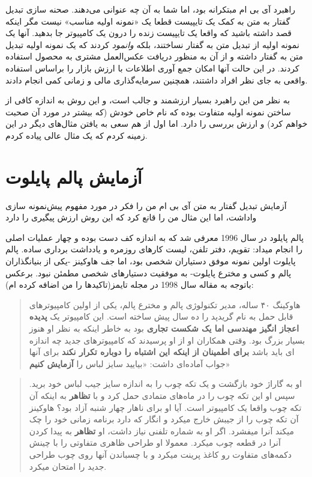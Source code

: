راهبرد آی بی ام مبتکرانه بود، اما شما به آن چه عنوانی می‌دهند. صحنه سازی
تبدیل گفتار به متن به کمک یک تایپیست قطعا یک «نمونه اولیه مناسب» نیست
مگر اینکه قصد داشته باشید که واقعا یک تایپیست زنده را درون یک کامپیوتر
جا بدهید. آنها یک نمونه اولیه از تبدیل متن به گفتار نساختند، بلکه
\emph{وانمود} کردند که یک نمونه اولیه تبدیل متن به گفتار داشته و از آن
به منظور دریافت عکس‌العمل مشتری به محصول استفاده کردند. در این حالت آنها
امکان جمع آوری اطلاعات با ارزش بازار را براساس استفاده واقعی به جای نظر
افراد داشتند، همچنین سرمایه‌گذاری مالی و زمانی کمی انجام دادند.

به نظر من این راهبرد بسیار ارزشمند و جالب است، و این روش به اندازه کافی
از ساختن نمونه اولیه متفاوت بوده که نام خاص خودش (که بیشتر در مورد آن
صحبت خواهم کرد) و ارزش بررسی را دارد. اما اول از هم سعی به یافتن
مثال‌های دیگر در این زمینه کردم که یک مثال عالی پیاده کردم.

\section{آزمایش پالم
پایلوت}\label{ux622ux632ux645ux627ux6ccux634-ux67eux627ux644ux645-ux67eux627ux6ccux644ux648ux62a}

آزمایش تبدیل گفتار به متن آی بی ام من را فکر در مورد مفهوم پیش‌نمونه
سازی واداشت، اما این مثال من را قانع کرد که این روش ارزش پیگیری را دارد

پالم پایلود در سال 1996 معرفی شد که به اندازه کف دست بوده و چهار عملیات
اصلی را انجام میداد: تقویم، دفتر تلفن، لیست کارهای روزمره و یادداشت
برداری ساده. پالم پایلوت اولین نمونه موفق دستیاران شخصی بود، اما جف
هاوکینز -یکی از بنیانگذاران پالم و کسی و مخترع پایلوت- به موفقیت
دستیارهای شخصی مطمئن نبود. برعکس باتوجه به مقاله سال 1998 در مجله
تایمز(تاکیدها را من اضافه کرده ام):

\begin{quote}
هاوکینگ ۴۰ ساله، مدیر تکنولوژی پالم و مخترع پالم، یکی از اولین
کامپیوترهای قابل حمل به نام گریدپد را ده سال پیش ساخته است. این کامپیوتر
یک \textbf{پدیده اعجاز انگیز مهندسی اما یک شکست تجاری} بود به خاطر اینکه
به نظر او هنوز بسیار بزرگ بود. وقتی همکاران او از او پرسیدند که
کامپیوترهای جدید چه اندازه ای باید باشد \textbf{برای اطمینان از اینکه
این اشتباه را دوباره تکرار نکند} برای آنها جواب آماده‌ای داشت: «بیایید
سایز لباس را \textbf{آزمایش کنیم}»
\end{quote}

\begin{quote}
او به گاراژ خود بازگشت و یک تکه چوب را به اندازه سایز جیب لباس خود برید.
سپس او این تکه چوب را در ماه‌های متمادی حمل کرد و با \textbf{تظاهر} به
اینکه آن تکه چوب واقعا یک کامپیوتر است. آیا او برای ناهار چهار شنبه آزاد
بود؟ هاوکینز آن تکه چوب را از جیبش خارج میکرد و انگار که دارد برنامه
زمانی خود را چک میکند آنرا میفشرد. اگر او به شماره تلفنی نیاز داشت، او
\textbf{تظاهر} به پیدا کردن آنرا در قطعه چوب میکرد. معمولا او طراحی
ظاهری متفاوتی را با چینش دکمه‌های متفاوت رو کاغذ پرینت میکرد و با
چسباندن آنها روی چوب طراحی جدید را امتحان میکرد.
\end{quote}


